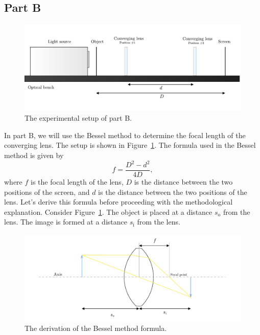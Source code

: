 \documentclass[10pt]{article}
\begin{document}
\subsection*{Part B}

\begin{figure}[hbt!]
  \centering
  \includegraphics[scale=0.5]{figures/f4.pdf}
  \caption{The experimental setup of part B.}
  \label{fig:4}
\end{figure}

In part B, we will use the Bessel method to determine the focal length of the converging lens. The setup is shown in Figure~\ref{fig:4}. The formula used in the Bessel method is given by
\begin{equation}
  f = \dfrac{D^2 - d^2}{4D},
\end{equation}
where $f$ is the focal length of the lens, $D$ is the distance between the two positions of the screen, and $d$ is the distance between the two positions of the lens. Let's derive this formula before proceeding with the methodological explanation. Consider Figure~\ref{fig:4}. The object is placed at a distance $s_{\text{o}}$ from the lens. The image is formed at a distance $s_{\text{i}}$ from the lens. 

\begin{figure}[hbt!]
  \centering
  \includegraphics[scale=0.5]{figures/f5.pdf}
  \caption{The derivation of the Bessel method formula.}
  \label{fig:5}
\end{figure}
\end{document}
